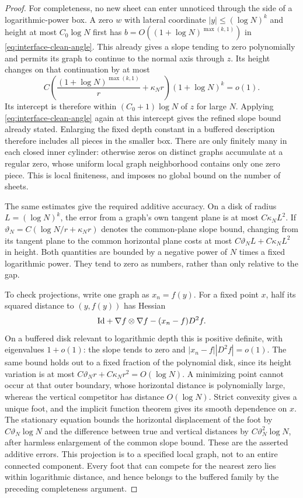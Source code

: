 \begin{proof}
For completeness, no new sheet can enter unnoticed through the side
of a logarithmic-power box.  A zero $w$ with lateral coordinate
$|y|\le(\log N)^k$ and height at most $C_0\log N$ first has
$b=O((1+\log N)^{\max(k,1)})$ in
\eqref{eq:interface-clean-angle}.  This already gives a slope tending
to zero polynomially and permits its graph to continue to the normal
axis through $z$.  Its height changes on that continuation by at most
\[
 C\left(\frac{(1+\log N)^{\max(k,1)}}r+\kappa_Nr\right)
       (1+\log N)^k=o(1).
\]
Its intercept is therefore within $(C_0+1)\log N$ of $z$ for large
$N$.  Applying \eqref{eq:interface-clean-angle} again at this
intercept gives the refined slope bound already stated.  Enlarging
the fixed depth constant in a buffered description therefore includes
all pieces in the smaller box.  There are only finitely many in each
closed inner cylinder: otherwise zeros on distinct graphs accumulate
at a regular zero, whose uniform local graph neighborhood contains
only one zero piece.  This is local finiteness, and imposes no global
bound on the number of sheets.

The same estimates give the required additive accuracy.  On a disk
of radius $L=(\log N)^k$, the error from a graph's own tangent plane
is at most $C\kappa_NL^2$.  If
$\vartheta_N=C(\log N/r+\kappa_Nr)$ denotes the common-plane slope
bound, changing from its tangent plane to the common horizontal
plane costs at most $C\vartheta_NL+C\kappa_NL^2$ in height.
Both quantities are bounded by a negative power of $N$ times a
fixed logarithmic power.  They tend to zero as numbers, rather than
only relative to the gap.

To check projections, write one graph as $x_n=f(y)$.  For a fixed
point $x$, half its squared distance to $(y,f(y))$ has Hessian
\[
 \mathrm{Id}+\nabla f\otimes\nabla f-(x_n-f)D^2f.
\]
On a buffered disk relevant to logarithmic depth this is positive
definite, with eigenvalues $1+o(1)$: the slope tends to zero and
$|x_n-f||D^2f|=o(1)$.  The same bound holds out to a fixed fraction
of the polynomial disk, since its height variation is at most
$C\vartheta_Nr+C\kappa_Nr^2=O(\log N)$.
A minimizing point cannot occur at that outer boundary, whose
horizontal distance is polynomially large, whereas the vertical
competitor has distance $O(\log N)$.  Strict convexity gives a unique
foot, and the implicit function theorem gives its smooth dependence
on $x$.  The stationary equation bounds the horizontal displacement
of the foot by $C\vartheta_N\log N$ and the difference between true
and vertical distances by $C\vartheta_N^2\log N$, after harmless
enlargement of the common slope bound.  These are the asserted
additive errors.  This projection is to a specified local graph, not to an entire
connected component.  Every foot that can compete for the nearest
zero lies within logarithmic distance, and hence belongs to the
buffered family by the preceding completeness argument.


\end{proof}
